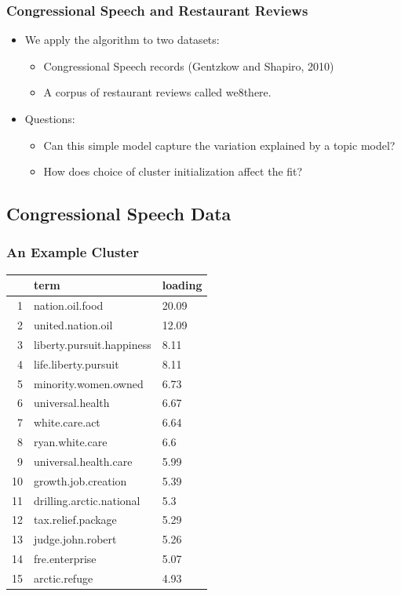 \documentclass[handout]{beamer}
\begin{document}
\begin{frame}
\frametitle{Congressional Speech and Restaurant Reviews}
\begin{itemize}
\item<+-> We apply the algorithm to two datasets:
	\begin{itemize} 
	\item Congressional Speech records (Gentzkow and Shapiro, 2010) 
	\item A corpus of restaurant reviews called we8there.
	\end{itemize}
\item<+-> Questions:
	\begin{itemize}
	\item Can this simple model capture the variation explained by a topic model?
	\item How does choice of cluster initialization affect the fit? 
	\end{itemize}
\end{itemize}
\end{frame}


\subsection{Congressional Speech Data}

\begin{frame}
\frametitle{An Example Cluster}
\begin{center}
\small
\begin{tabular}{rll}
  \hline
 & term & loading \\ 
  \hline
1 & nation.oil.food & 20.09 \\ 
  2 & united.nation.oil & 12.09 \\ 
  3 & liberty.pursuit.happiness & 8.11 \\ 
  4 & life.liberty.pursuit & 8.11 \\ 
  5 & minority.women.owned & 6.73 \\ 
  6 & universal.health & 6.67 \\ 
  7 & white.care.act & 6.64 \\ 
  8 & ryan.white.care & 6.6 \\ 
  9 & universal.health.care & 5.99 \\ 
  10 & growth.job.creation & 5.39 \\ 
  11 & drilling.arctic.national & 5.3 \\ 
  12 & tax.relief.package & 5.29 \\ 
  13 & judge.john.robert & 5.26 \\ 
  14 & fre.enterprise & 5.07 \\ 
  15 & arctic.refuge & 4.93 \\ 
   \hline
\end{tabular}
\end{center}
\end{frame}
\end{document}
